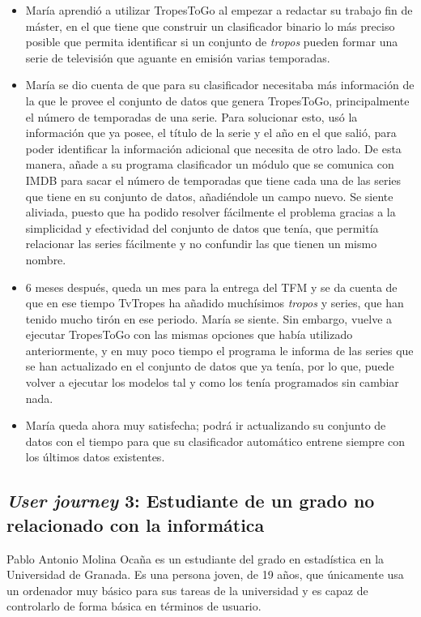 \begin{itemize}
    \item María aprendió a utilizar TropesToGo al empezar a redactar su trabajo
    fin de máster, en el que tiene que construir un clasificador binario lo más
    preciso posible que permita identificar si un conjunto de \textit{tropos}
    pueden formar una serie de televisión que aguante en emisión varias
    temporadas.
    \item María se dio cuenta de que para su clasificador necesitaba más
    información de la que le provee el conjunto de datos que genera TropesToGo,
    principalmente el número de temporadas de una serie. Para solucionar esto,
    usó la información que ya posee, el título de la serie y el año en el que
    salió, para poder identificar la información adicional que necesita de otro
    lado. De esta manera, añade a su programa clasificador un módulo que se
    comunica con IMDB para sacar el número de temporadas que tiene cada una de
    las series que tiene en su conjunto de datos, añadiéndole un campo nuevo. Se
    siente aliviada, puesto que ha podido resolver fácilmente el problema
    gracias a la simplicidad y efectividad del conjunto de datos que tenía, que
    permitía relacionar las series fácilmente y no confundir las que tienen un
    mismo nombre.
    \item 6 meses después, queda un mes para la entrega del TFM y se da cuenta
    de que en ese tiempo TvTropes ha añadido muchísimos \textit{tropos} y
    series, que han tenido mucho tirón en ese periodo. María se siente. Sin
    embargo, vuelve a ejecutar TropesToGo con las mismas opciones que había
    utilizado anteriormente, y en muy poco tiempo el programa le informa de las
    series que se han actualizado en el conjunto de datos que ya tenía, por lo
    que, puede volver a ejecutar los modelos tal y como los tenía programados
    sin cambiar nada.
    \item María queda ahora muy satisfecha; podrá ir actualizando su conjunto de
    datos con el tiempo para que su clasificador automático entrene siempre con
    los últimos datos existentes.
\end{itemize}

\subsection{\textit{User journey} 3: Estudiante de un grado no relacionado con
la informática} 

Pablo Antonio Molina Ocaña es un estudiante del grado en estadística en la
Universidad de Granada. Es una persona joven, de 19 años, que únicamente usa un
ordenador muy básico para sus tareas de la universidad y es capaz de controlarlo
de forma básica en términos de usuario.

